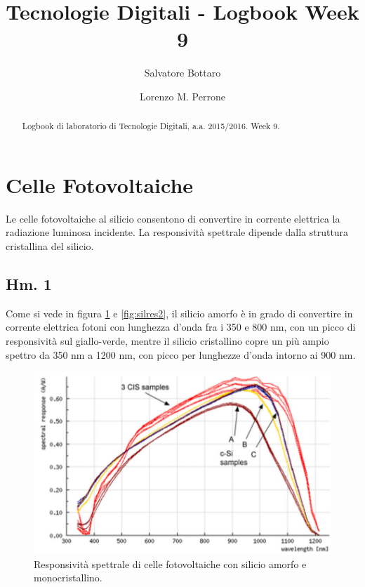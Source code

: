 \documentclass[journal, a4paper]{IEEEtran}
\begin{document}
	\title{Tecnologie Digitali - Logbook Week 9}
	\author[1]{Salvatore Bottaro}
		\author[2]{Lorenzo M. Perrone}
	\maketitle
	
\begin{abstract}
	Logbook di laboratorio di Tecnologie Digitali, a.a. 2015/2016. Week 9.
\end{abstract}

\section{Celle Fotovoltaiche}

Le celle fotovoltaiche al silicio consentono di convertire in corrente elettrica la radiazione luminosa incidente. La responsività spettrale dipende dalla struttura cristallina del silicio.

\subsection{Hm. 1}

Come si vede in figura \ref{fig:silres1} e \ref{fig:silres2}, il silicio amorfo è in grado di convertire in corrente elettrica fotoni con lunghezza d'onda fra i 350 e 800 nm, con un picco di responsività sul giallo-verde, mentre il silicio cristallino copre un più ampio spettro da 350 nm a 1200 nm, con picco per lunghezze d'onda intorno ai 900 nm.

\begin{figure}[htp]
\centering
\includegraphics[scale=.5]{c-Si_SR}
\caption{Responsività spettrale di celle fotovoltaiche con silicio amorfo e monocristallino.}
\label{fig:silres1}
\end{figure}
\end{document}
